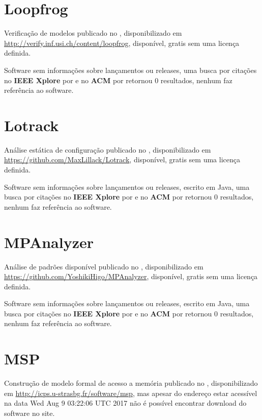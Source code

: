 \section{Loopfrog}

Verificação de modelos
publicado no  ,
disponibilizado em \url{http://verify.inf.usi.ch/content/loopfrog},
disponível,
gratis
sem uma licença definida.

Software sem informações sobre lançamentos ou releases,
uma busca por citações no {\bf IEEE Xplore} por
\texttt{}
e no {\bf ACM} por
\texttt{}
retornou
0 resultados,
nenhum faz referência ao software.



\section{Lotrack}

Análise estática de configuração
publicado no  ,
disponibilizado em \url{https://github.com/MaxLillack/Lotrack},
disponível,
gratis
sem uma licença definida.

Software sem informações sobre lançamentos ou releases,
escrito em Java,
uma busca por citações no {\bf IEEE Xplore} por
\texttt{}
e no {\bf ACM} por
\texttt{}
retornou
0 resultados,
nenhum faz referência ao software.



\section{MPAnalyzer}

Análise de padrões disponível
publicado no  ,
disponibilizado em \url{https://github.com/YoshikiHigo/MPAnalyzer},
disponível,
gratis
sem uma licença definida.

Software sem informações sobre lançamentos ou releases,
escrito em Java,
uma busca por citações no {\bf IEEE Xplore} por
\texttt{}
e no {\bf ACM} por
\texttt{}
retornou
0 resultados,
nenhum faz referência ao software.



\section{MSP}

Construção de modelo formal de acesso a memória
publicado no  ,
disponibilizado em \url{http://icps.u-strasbg.fr/software/msp},
mas apesar do endereço estar acessível na data 
Wed Aug  9 03:22:06 UTC 2017
não é possível encontrar download do software no site.

